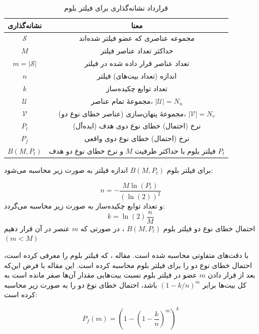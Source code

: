 \begin{table}[h]
	\centering
	\caption{قرارداد نشانه‌گذاری برای فیلتر بلوم}
	\label{table:BloomFilter}
	\begin{tabular}{|c|c|}
		\hline
		نشانه‌گذاری & معنا \\
		\hline
		\hline
		$\mathcal{S}$ & مجموعه عناصری که عضو فیلتر شده‌اند \\
		\hline
		$M$ & حداکثر تعداد عناصر فیلتر\\
		\hline
		$m = |\mathcal{S}|$ & تعداد عناصر قرار داده شده در فیلتر\\
		\hline
		$n$ & اندازه (تعداد بیت‌های) فیلتر \\
		\hline
		$k$ & تعداد توابع چکیده‌ساز\\
		\hline
		$\mathcal{U}$ & مجموعهٔ تمام عناصر، $|\mathcal{U}| = N_u$ \\
		\hline
		$\mathcal{V}$ & مجموعهٔ پنهان‌سازی (عناصر خطای نوع دو)، $|\mathcal{V}| = N_v$\\
		\hline
		$P_t$ & نرخ (احتمال) خطای نوع دوی هدف (ایده‌آل)\\
		\hline
		$P_f$ & نرخ (احتمال) خطای نوع دوی واقعی \\
		\hline
		$B(M, P_t)$ & فیلتر بلوم با حداکثر ظرفیت $M$ و نرخ خطای نوع دو هدف $P_t$ \\
		\hline
	\end{tabular}
\end{table}

برای فیلتر بلوم
$B(M, P_t)$
اندازه فیلتر به صورت زیر محاسبه می‌شود\cite{Gervais2014}:

\begin{equation}
n=-\frac{M\ln(P_t)}{\left(\ln(2)\right)^2} \label{eq:n_of_bloom_filter}
\end{equation}
و تعداد توابع چکیده‌ساز به صورت زیر محاسبه می‌گردد\cite{Gervais2014}:
\begin{equation}
k=\ln(2)\frac{n}{M} \label{eq:k_of_bloom_filter}
\end{equation}
احتمال خطای نوع دو فیلتر بلوم
$B(M, P_t)$
، در صورتی که $m$ عنصر در آن قرار دهیم 
$(m<M)$

با دقت‌های متفاوتی محاسبه شده است. مقاله \cite{Bloom1970}، که فیلتر بلوم را معرفی کرده است، احتمال خطای نوع دو را برای فیلتر بلوم محاسبه کرده است. این مقاله با فرض این‌که بعد از قرار دادن $m$ عضو در فیلتر بلوم نسبت بیت‌هایی مقدار آن‌ها صفر مانده است به کل بیت‌ها برابر
$(1-k/n)^m$
باشد، احتمال خطای نوع دو را به صورت زیر محاسبه کرده است:

\begin{equation}
P_f(m) = \left(1-\left(1-\frac{k}{n}\right)^{m}\right)^k \label{eq:Pf_of_bloom_filter_Bloom}
\end{equation}

